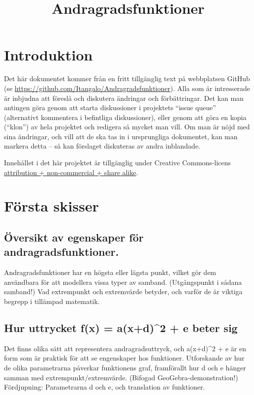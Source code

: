 \documentclass[12pt]{article}
\title{Andragradsfunktioner}
\date{}
\begin{document}
  \maketitle
  
  
  
  \section{Introduktion}
  Det här dokumentet kommer från en fritt tillgänglig text på webbplatsen GitHub (se \url{https://github.com/Itangalo/Andragradsfunktioner}).
  Alla som är intresserade är inbjudna att föreslå och diskutera ändringar och förbättringar.
  Det kan man antingen göra genom att starta diskussioner i projektets ``issue queue'' (alternativt kommentera i befintliga diskussioner), eller genom att göra en kopia (``klon'') av hela projektet och redigera så mycket man vill.
  Om man är nöjd med sina ändringar, och vill att de ska tas in i ursprungliga dokumentet, kan man markera detta -- så kan förslaget diskuteras av andra inblandade.

  Innehållet i det här projektet är tillgänglig under Creative Commons-licens \href{http://creativecommons.org/licenses/by-nc-sa/3.0/}{attribution + non-commercial + share alike}.


  \section{Första skisser}

  \subsection{Översikt av egenskaper för andragradsfunktioner.}
  Andragradsfunktioner har en högsta eller lägsta punkt, vilket gör dem användbara för att modellera vissa typer av samband.
  (Utgångspunkt i sådana samband!)
  Vad extrempunkt och extremvärde betyder, och varför de är viktiga begrepp i tillämpad matematik.

  \subsection{Hur uttrycket f(x) = a(x+d)^2 + e beter sig}
  Det finns olika sätt att representera andragradsuttryck, och a(x+d)^2 + e är en form som är praktisk för att se engenskaper hos funktioner.
  Utforskande av hur de olika parametrarna påverkar funktionens graf, framförallt hur d och e hänger samman med extrempunkt/extremvärde.
  (Bifogad GeoGebra-demonstration!)
  Fördjupning: Parametrarna d och e, och translation av funktioner.
  
\end{document}
